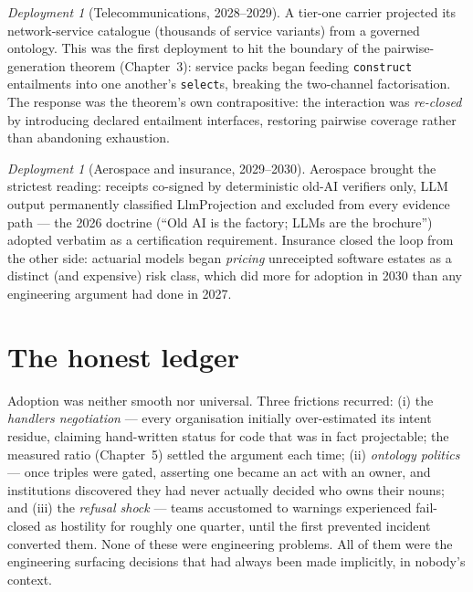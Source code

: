 \documentclass[11pt,a4paper]{report}
\theoremstyle{definition}
\theoremstyle{remark}
\newtheorem{casestudy}[theorem]{Deployment}
\begin{document}
\begin{casestudy}[Telecommunications, 2028--2029]\label{dep:telco}
A tier-one carrier projected its network-service catalogue (thousands of
service variants) from a governed ontology. This was the first deployment
to hit the boundary of the pairwise-generation theorem
(Chapter~3): service packs began feeding \texttt{construct} entailments
into one another's \texttt{select}s, breaking the two-channel factorisation.
The response was the theorem's own contrapositive: the interaction was
\emph{re-closed} by introducing declared entailment interfaces, restoring
pairwise coverage rather than abandoning exhaustion.
\end{casestudy}

\begin{casestudy}[Aerospace and insurance, 2029--2030]
Aerospace brought the strictest reading: receipts co-signed by deterministic
old-AI verifiers only, LLM output permanently classified
$\mathrm{LlmProjection}$ and excluded from every evidence path --- the
2026 doctrine (``Old AI is the factory; LLMs are the brochure'') adopted
verbatim as a certification requirement. Insurance closed the loop from the
other side: actuarial models began \emph{pricing} unreceipted software
estates as a distinct (and expensive) risk class, which did more for
adoption in 2030 than any engineering argument had done in 2027.
\end{casestudy}

\section{The honest ledger}

Adoption was neither smooth nor universal. Three frictions recurred:
(i) the \emph{handlers negotiation} --- every organisation initially
over-estimated its intent residue, claiming hand-written status for code
that was in fact projectable; the measured ratio (Chapter~5) settled the
argument each time; (ii) \emph{ontology politics} --- once triples were
gated, asserting one became an act with an owner, and institutions
discovered they had never actually decided who owns their nouns; and
(iii) the \emph{refusal shock} --- teams accustomed to warnings experienced
fail-closed as hostility for roughly one quarter, until the first prevented
incident converted them. None of these were engineering problems. All of
them were the engineering surfacing decisions that had always been made
implicitly, in nobody's context.

\end{document}
